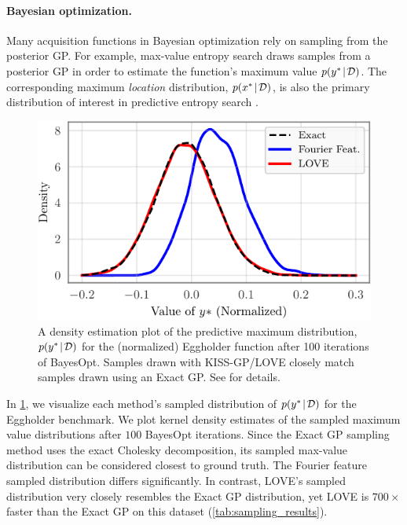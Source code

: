 \paragraph{Bayesian optimization.}
Many acquisition functions in Bayesian optimization rely on sampling from the posterior GP.
For example, max-value entropy search \cite{wang2017max} draws samples from a posterior GP in order to estimate the function's maximum value $p(y^{*} \! \mid \! \mathcal D)$.
The corresponding maximum \emph{location} distribution, $p(x^{*} \! \mid \! \mathcal D)$, is also the primary distribution of interest in predictive entropy search \cite{hernandez2014predictive}.
%
\begin{figure}[t!]
  \centering
  \includegraphics[width=\columnwidth]{figures/thompson_sampling_comparison.pdf}
  \vspace{-4ex}
  \caption{
    A density estimation plot of the predictive maximum distribution, $p(y^* \! \mid \! \mathcal D)$ for the (normalized) Eggholder function after 100 iterations of BayesOpt.
    Samples drawn with KISS-GP/LOVE{} closely match samples drawn using an Exact GP. See \citet{wang2017max} for details.
    \label{fig:thompson_sampling_comparison}
  }
    \vspace{-2ex}
\end{figure}
%
In \cref{fig:thompson_sampling_comparison}, we visualize each method's sampled distribution of $p(y^{*} \! \mid \! \mathcal D)$ for the Eggholder benchmark.
We plot kernel density estimates of the sampled maximum value distributions after $100$ BayesOpt iterations.
Since the Exact GP sampling method uses the exact Cholesky decomposition, its sampled max-value distribution can be considered closest to ground truth.
The Fourier feature sampled distribution differs significantly.
In contrast, LOVE{}'s sampled distribution very closely resembles the Exact GP distribution, yet
LOVE{} is $700 \times$ faster than the Exact GP on this dataset (\cref{tab:sampling_results}).
